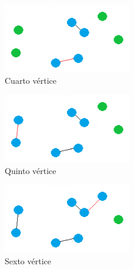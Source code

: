 \begin{frame}
	\begin{exampleblock}{ }
	\begin{figure}[htbH] 
		\centering
		\includegraphics[width=0.5\textwidth]{./Imagenes/arista3.png}
		\caption{Cuarto vértice} 
	\end{figure}
	\end{exampleblock}
\end{frame}	

\begin{frame}
	\begin{exampleblock}{ }
	\begin{figure}[htbH] 
		\centering
		\includegraphics[width=0.5\textwidth]{./Imagenes/arista4.png}
		\caption{Quinto vértice} 
	\end{figure}
	\end{exampleblock}
\end{frame}

\begin{frame}
	\begin{exampleblock}{ }
	\begin{figure}[htbH] 
		\centering
		\includegraphics[width=0.5\textwidth]{./Imagenes/arista5.png}
		\caption{Sexto vértice} 
	\end{figure}
	\end{exampleblock}
\end{frame}

